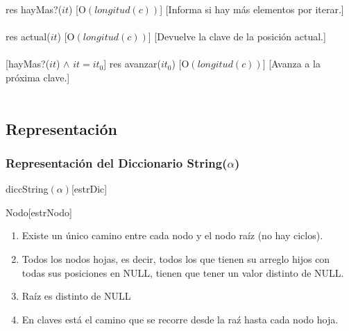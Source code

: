   {res \igobs hayMas?($it$)}%
  [O$(longitud(c))$] %
  [Informa si hay m\'as elementos por iterar.]\\\\

  {res \igobs actual($it$)}
  [O$(longitud(c))$]%
  [Devuelve la clave de la posici\'on actual.]\\\\

  [hayMas?($it$) $\land$ $it = it_{0}$] %
  {res \igobs avanzar($it_{0}$)}
  [O$(longitud(c))$]%
  [Avanza a la pr\'oxima clave.]\\\\


\subsection{Representaci\'on}
  
  \subsubsection{Representaci\'on del Diccionario String($\alpha$)}
  \begin{Estructura}{diccString$(\alpha)$}[estrDic]
    \begin{Tupla}[estrDic]
    \end{Tupla}
\end{Estructura}

  \begin{Estructura}{Nodo}[estrNodo]
    \begin{Tupla}[estrNodo]
    \end{Tupla}
\end{Estructura}


\renewcommand{\labelenumi}{(\Roman{enumi})}
 \begin{enumerate}
 	\item Existe un \'unico camino entre cada nodo y el nodo ra\'iz (no hay ciclos).
 	\item Todos los nodos hojas, es decir, todos los que tienen su arreglo hijos con todas sus posiciones en NULL, tienen que tener un valor distinto de NULL.
 	\item Ra\'iz es distinto de NULL
 	\item En claves est\'a el camino que se recorre desde la ra\'z hasta cada nodo hoja.
  \end{enumerate}

